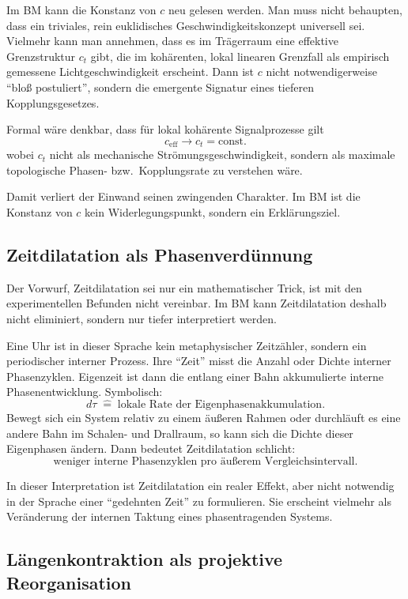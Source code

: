 \documentclass[12pt,a4paper]{article}
\begin{document}
	Im BM kann die Konstanz von \(c\) neu gelesen werden. Man muss nicht behaupten, dass ein triviales, rein euklidisches Geschwindigkeitskonzept universell sei. Vielmehr kann man annehmen, dass es im Trägerraum eine effektive Grenzstruktur \(c_t\) gibt, die im kohärenten, lokal linearen Grenzfall als empirisch gemessene Lichtgeschwindigkeit erscheint. Dann ist \(c\) nicht notwendigerweise ``bloß postuliert'', sondern die emergente Signatur eines tieferen Kopplungsgesetzes.
	
	Formal wäre denkbar, dass für lokal kohärente Signalprozesse gilt
	\[
	c_{\mathrm{eff}} \to c_t = \mathrm{const.}
	\]
	wobei \(c_t\) nicht als mechanische Strömungsgeschwindigkeit, sondern als maximale topologische Phasen- bzw.\ Kopplungsrate zu verstehen wäre.
	
	Damit verliert der Einwand seinen zwingenden Charakter. Im BM ist die Konstanz von \(c\) kein Widerlegungspunkt, sondern ein Erklärungsziel.
	
	\subsection{Zeitdilatation als Phasenverdünnung}
	
	Der Vorwurf, Zeitdilatation sei nur ein mathematischer Trick, ist mit den experimentellen Befunden nicht vereinbar. Im BM kann Zeitdilatation deshalb nicht eliminiert, sondern nur tiefer interpretiert werden.
	
	Eine Uhr ist in dieser Sprache kein metaphysischer Zeitzähler, sondern ein periodischer interner Prozess. Ihre ``Zeit'' misst die Anzahl oder Dichte interner Phasenzyklen. Eigenzeit ist dann die entlang einer Bahn akkumulierte interne Phasenentwicklung. Symbolisch:
	\[
	d\tau \;\widehat{=}\; \text{lokale Rate der Eigenphasenakkumulation}.
	\]
	Bewegt sich ein System relativ zu einem äußeren Rahmen oder durchläuft es eine andere Bahn im Schalen- und Drallraum, so kann sich die Dichte dieser Eigenphasen ändern. Dann bedeutet Zeitdilatation schlicht:
	\[
	\text{weniger interne Phasenzyklen pro äußerem Vergleichsintervall}.
	\]
	
	In dieser Interpretation ist Zeitdilatation ein realer Effekt, aber nicht notwendig in der Sprache einer ``gedehnten Zeit'' zu formulieren. Sie erscheint vielmehr als Veränderung der internen Taktung eines phasentragenden Systems.
	
	\subsection{Längenkontraktion als projektive Reorganisation}
	
\end{document}
